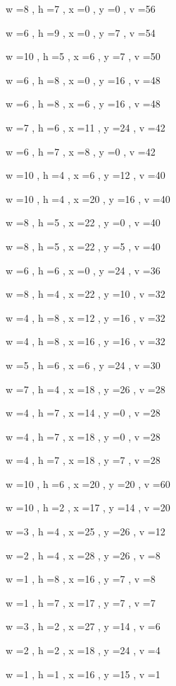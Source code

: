\documentclass[11pt]{article}
\begin{document}
w =8 , h =7 , x =0 , y =0 , v =56
\par
w =6 , h =9 , x =0 , y =7 , v =54
\par
w =10 , h =5 , x =6 , y =7 , v =50
\par
w =6 , h =8 , x =0 , y =16 , v =48
\par
w =6 , h =8 , x =6 , y =16 , v =48
\par
w =7 , h =6 , x =11 , y =24 , v =42
\par
w =6 , h =7 , x =8 , y =0 , v =42
\par
w =10 , h =4 , x =6 , y =12 , v =40
\par
w =10 , h =4 , x =20 , y =16 , v =40
\par
w =8 , h =5 , x =22 , y =0 , v =40
\par
w =8 , h =5 , x =22 , y =5 , v =40
\par
w =6 , h =6 , x =0 , y =24 , v =36
\par
w =8 , h =4 , x =22 , y =10 , v =32
\par
w =4 , h =8 , x =12 , y =16 , v =32
\par
w =4 , h =8 , x =16 , y =16 , v =32
\par
w =5 , h =6 , x =6 , y =24 , v =30
\par
w =7 , h =4 , x =18 , y =26 , v =28
\par
w =4 , h =7 , x =14 , y =0 , v =28
\par
w =4 , h =7 , x =18 , y =0 , v =28
\par
w =4 , h =7 , x =18 , y =7 , v =28
\par
w =10 , h =6 , x =20 , y =20 , v =60
\par
w =10 , h =2 , x =17 , y =14 , v =20
\par
w =3 , h =4 , x =25 , y =26 , v =12
\par
w =2 , h =4 , x =28 , y =26 , v =8
\par
w =1 , h =8 , x =16 , y =7 , v =8
\par
w =1 , h =7 , x =17 , y =7 , v =7
\par
w =3 , h =2 , x =27 , y =14 , v =6
\par
w =2 , h =2 , x =18 , y =24 , v =4
\par
w =1 , h =1 , x =16 , y =15 , v =1
\par
\newpage
\end{document}

